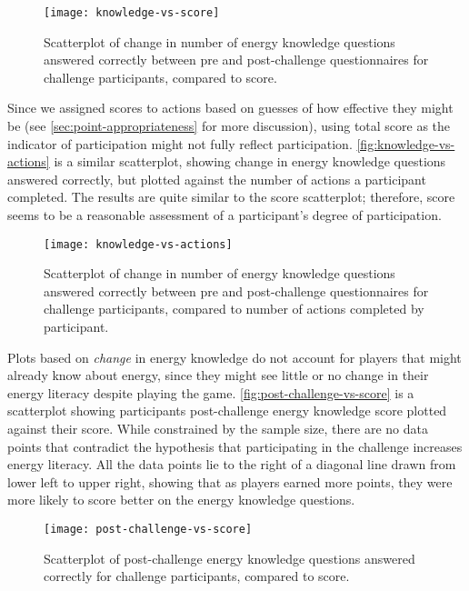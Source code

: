 \begin{figure}[htbp]
	\centering
	\texttt{[image: knowledge-vs-score]}
	\caption[Scatterplot of change in energy knowledge and participant score]{Scatterplot of change in number of energy knowledge questions answered correctly between pre and post-challenge questionnaires for challenge participants, compared to score.}
	\label{fig:knowledge-vs-score}
\end{figure}

Since we assigned scores to actions based on guesses of how effective they might be (see \autoref{sec:point-appropriateness} for more discussion), using total score as the indicator of participation might not fully reflect participation. \autoref{fig:knowledge-vs-actions} is a similar scatterplot, showing change in energy knowledge questions answered correctly, but plotted against the number of actions a participant completed. The results are quite similar to the score scatterplot; therefore, score seems to be a reasonable assessment of a participant's degree of participation.

\begin{figure}[htbp]
	\centering
	\texttt{[image: knowledge-vs-actions]}
	\caption[Scatterplot of change in energy knowledge and actions completed]{Scatterplot of change in number of energy knowledge questions answered correctly between pre and post-challenge questionnaires for challenge participants, compared to number of actions completed by participant.}
	\label{fig:knowledge-vs-actions}
\end{figure}

Plots based on \emph{change} in energy knowledge do not account for players that might already know about energy, since they might see little or no change in their energy literacy despite playing the game. \autoref{fig:post-challenge-vs-score} is a scatterplot showing participants post-challenge energy knowledge score plotted against their score. While constrained by the sample size, there are no data points that contradict the hypothesis that participating in the challenge increases energy literacy. All the data points lie to the right of a diagonal line drawn from lower left to upper right, showing that as players earned more points, they were more likely to score better on the energy knowledge questions.

\begin{figure}[htbp]
	\centering
	\texttt{[image: post-challenge-vs-score]}
	\caption[Scatterplot of post-challenge energy knowledge and participant score]{Scatterplot of post-challenge energy knowledge questions answered correctly for challenge participants, compared to score.}
	\label{fig:post-challenge-vs-score}
\end{figure}

